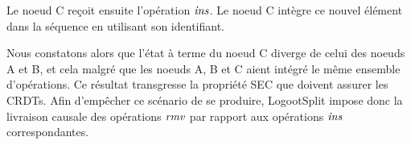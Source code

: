 Le noeud C reçoit ensuite l'opération $\mathit{ins}$.
Le noeud C intègre ce nouvel élément dans la séquence en utilisant son identifiant.

Nous constatons alors que l'état à terme du noeud C diverge de celui des noeuds A et B, et cela malgré que les noeuds A, B et C aient intégré le même ensemble d'opérations.
Ce résultat transgresse la propriété \ac{SEC} que doivent assurer les \acp{CRDT}.
Afin d'empêcher ce scénario de se produire, LogootSplit impose donc la livraison causale des opérations $\mathit{rmv}$ par rapport aux opérations $\mathit{ins}$ correspondantes.
